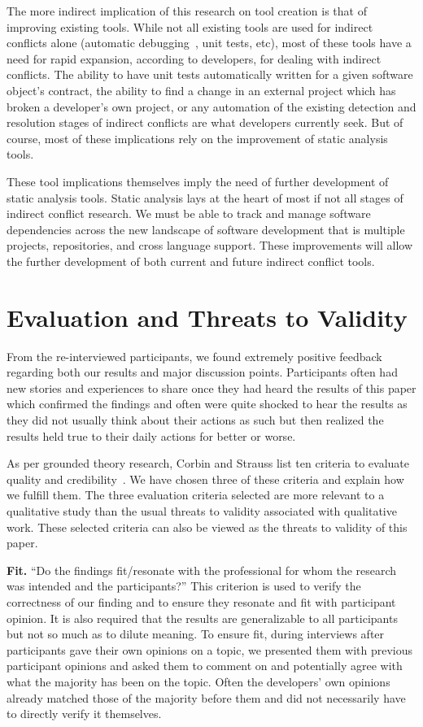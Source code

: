 \documentclass[conference]{IEEEtran}
\begin{document}
The more indirect implication of this research on tool creation is that of improving existing tools. While not all existing
tools are used for indirect conflicts alone (automatic debugging~\cite{Zeller:2005:WPF}, unit tests, etc), most of these tools
have a need for rapid expansion, according to developers, for dealing with indirect conflicts. The ability to have unit tests
automatically written for a given software object's contract, the ability to find a change  in an external project
which has broken a developer's own project, or any automation of the existing detection and resolution stages of indirect
conflicts are what developers currently seek. But of course, most of these implications rely on the improvement of
static analysis tools.

These tool implications themselves imply the need of further development of static analysis tools. Static
analysis lays at the heart of most if not all stages of indirect conflict research. We must be able to track and manage
software dependencies across the new landscape of software development that is multiple projects, repositories, and cross
language support. These improvements will allow the further development of both current and future indirect conflict
tools.

\section{Evaluation and Threats to Validity}
\label{sec:eval}

From the re-interviewed participants, we found extremely positive feedback regarding both our results and major discussion
points. Participants often had new stories and experiences to share once they had heard the results of this paper which
confirmed the findings and often were quite shocked to hear the results as they did not usually think about their actions
as such but then realized the results held true to their daily actions for better or worse.

As per grounded theory research, Corbin and Strauss list ten criteria to evaluate quality and credibility~\cite{Corbin:1998:SP}.
We have chosen three of these criteria and explain how we fulfill them. The three evaluation criteria selected are more relevant
to a qualitative study than the usual threats to validity associated with qualitative work. These selected criteria can also
be viewed as the threats to validity of this paper.

{\bfseries Fit.} ``Do the findings fit/resonate with the professional for whom the research was intended and the participants?'' This
criterion is used to verify the correctness of our finding and to ensure they resonate and fit with participant opinion. It is also
required that the results are generalizable to all participants but not so much as to dilute meaning. To ensure fit, during interviews
after participants gave their own opinions on a topic, we presented them with previous participant opinions and asked them to comment
on and potentially agree with what the majority has been on the topic. Often the developers' own opinions already matched those of
the majority before them and did not necessarily have to directly verify it themselves.
\end{document}
